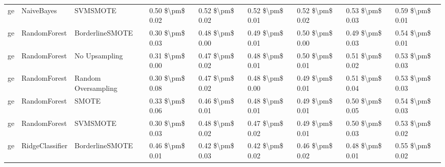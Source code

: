 \begin{tabular}{lllllllll}
      ge &                      NaiveBayes &                      SVMSMOTE & 0.50 \$\textbackslash pm\$ 0.02 &           0.52 \$\textbackslash pm\$ 0.02 &       0.52 \$\textbackslash pm\$ 0.01 &        0.52 \$\textbackslash pm\$ 0.02 &                         0.53 \$\textbackslash pm\$ 0.03 &     0.59 \$\textbackslash pm\$ 0.01 \\
      ge &                    RandomForest &               BorderlineSMOTE & 0.30 \$\textbackslash pm\$ 0.03 &           0.48 \$\textbackslash pm\$ 0.00 &       0.49 \$\textbackslash pm\$ 0.01 &        0.50 \$\textbackslash pm\$ 0.00 &                         0.49 \$\textbackslash pm\$ 0.03 &     0.54 \$\textbackslash pm\$ 0.01 \\
      ge &                    RandomForest &                 No Upsampling & 0.31 \$\textbackslash pm\$ 0.00 &           0.47 \$\textbackslash pm\$ 0.02 &       0.48 \$\textbackslash pm\$ 0.01 &        0.50 \$\textbackslash pm\$ 0.01 &                         0.51 \$\textbackslash pm\$ 0.02 &     0.53 \$\textbackslash pm\$ 0.03 \\
      ge &                    RandomForest &           Random Oversampling & 0.30 \$\textbackslash pm\$ 0.08 &           0.47 \$\textbackslash pm\$ 0.02 &       0.48 \$\textbackslash pm\$ 0.00 &        0.49 \$\textbackslash pm\$ 0.01 &                         0.51 \$\textbackslash pm\$ 0.04 &     0.53 \$\textbackslash pm\$ 0.03 \\
      ge &                    RandomForest &                         SMOTE & 0.33 \$\textbackslash pm\$ 0.06 &           0.46 \$\textbackslash pm\$ 0.01 &       0.48 \$\textbackslash pm\$ 0.01 &        0.49 \$\textbackslash pm\$ 0.01 &                         0.50 \$\textbackslash pm\$ 0.05 &     0.54 \$\textbackslash pm\$ 0.03 \\
      ge &                    RandomForest &                      SVMSMOTE & 0.30 \$\textbackslash pm\$ 0.03 &           0.48 \$\textbackslash pm\$ 0.02 &       0.47 \$\textbackslash pm\$ 0.02 &        0.49 \$\textbackslash pm\$ 0.01 &                         0.50 \$\textbackslash pm\$ 0.03 &     0.53 \$\textbackslash pm\$ 0.02 \\
      ge &                 RidgeClassifier &               BorderlineSMOTE & 0.46 \$\textbackslash pm\$ 0.01 &           0.42 \$\textbackslash pm\$ 0.03 &       0.42 \$\textbackslash pm\$ 0.02 &        0.46 \$\textbackslash pm\$ 0.02 &                         0.48 \$\textbackslash pm\$ 0.01 &     0.55 \$\textbackslash pm\$ 0.02 \\

\end{tabular}
